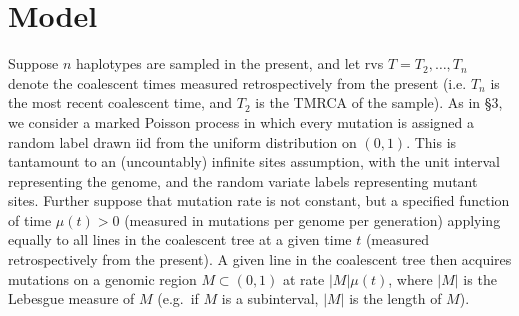\documentclass[11pt]{article}
\begin{document}
\section*{Model}\label{sec:model}

Suppose $n$ haplotypes are sampled in the present, and let rvs $T = T_2,\dots,T_n$ denote the coalescent times measured retrospectively from the present (i.e. $T_n$ is the most recent coalescent time, and $T_2$ is the TMRCA of the sample).
As in \cite{Griffiths1998-qf} \S3, we consider a marked Poisson process in which every mutation is assigned a random label drawn iid from the uniform distribution on $(0,1)$.
This is tantamount to an (uncountably) infinite sites assumption, with the unit interval representing the genome, and the random variate labels representing mutant sites.
Further suppose that mutation rate is not constant, but a specified function of time $\mu(t) > 0$ (measured in mutations per genome per generation) applying equally to all lines in the coalescent tree at a given time $t$ (measured retrospectively from the present).
A given line in the coalescent tree then acquires mutations on a genomic region $M\subset(0,1)$ at rate $|M|\mu(t)$, where $|M|$ is the Lebesgue measure of $M$ (e.g.\ if $M$ is a subinterval, $|M|$ is the length of $M$).
\end{document}
